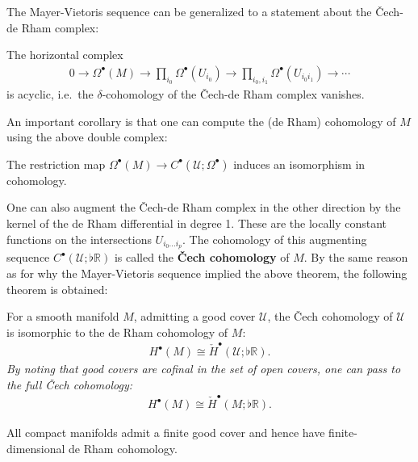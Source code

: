 
    The Mayer-Vietoris sequence can be generalized to a statement about the \v{C}ech-de Rham complex:
    \begin{property}
        The horizontal complex
        \begin{gather}
            0\longrightarrow\Omega^\bullet(M)\longrightarrow\prod_{i_0}\Omega^\bullet(U_{i_0})\longrightarrow\prod_{i_0,i_1}\Omega^\bullet(U_{i_0i_1})\longrightarrow\cdots
        \end{gather}
        is acyclic, i.e.~the $\delta$-cohomology of the \v{C}ech-de Rham complex vanishes.
    \end{property}

    An important corollary is that one can compute the (de Rham) cohomology of $M$ using the above double complex:
    \begin{property}
        The restriction map $\Omega^\bullet(M)\rightarrow C^\bullet(\mathcal{U};\Omega^\bullet)$ induces an isomorphism in cohomology.
    \end{property}
    One can also augment the \v{C}ech-de Rham complex in the other direction by the kernel of the de Rham differential in degree 1. These are the locally constant functions on the intersections $U_{i_0\ldots i_p}$. The cohomology of this augmenting sequence $C^\bullet(\mathcal{U};\flat\mathbb{R})$ is called the \textbf{\v{C}ech cohomology} of $M$. By the same reason as for why the Mayer-Vietoris sequence implied the above theorem, the following theorem is obtained:
    \begin{theorem}[\v{C}ech $=$ de Rham]
        For a smooth manifold $M$, admitting a good cover $\mathcal{U}$, the \v{C}ech cohomology of $\mathcal{U}$ is isomorphic to the de Rham cohomology of $M$:
        \begin{gather}
            H^\bullet(M)\cong\check{H}^\bullet(\mathcal{U};\flat\mathbb{R}).
        \end{gather}
        \emph{By noting that good covers are \textit{cofinal} in the set of open covers, one can pass to the full \v{C}ech cohomology:}
        \begin{gather}
            H^\bullet(M)\cong\check{H}^\bullet(M;\flat\mathbb{R}).
        \end{gather}
    \end{theorem}
    \begin{result}
        All compact manifolds admit a finite good cover and hence have finite-dimensional de Rham cohomology.
    \end{result}

